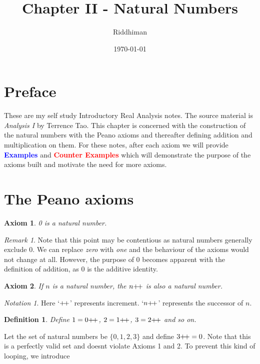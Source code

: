 \documentclass[12pt]{article}
\title{Chapter II - Natural Numbers}
\author{Riddhiman}
\date{\monthyeardate\today}
\newtheorem{axiom}{Axiom}
\newtheorem{definition}{Definition}[section]
\theoremstyle{remark}
\newtheorem*{remark}{Remark}
\newtheorem*{notation}{Notation}
\begin{document}
\def\inc{{\mathrel+\joinrel\mathrel+}}  

\maketitle

\section{Preface}%
\label{sec:Preface}
These are my self study Introductory Real Analysis notes. The source material is \textit{Analysis I} by Terrence Tao. This chapter is concerned with the construction of the natural numbers with the Peano axioms and thereafter defining addition and multiplication on them. For these notes, after each axiom we will provide \textcolor{blue}{\textbf{Examples}} and \textcolor{red}{\textbf{Counter Examples}} which will demonstrate the purpose of the axioms built and motivate the need for more axioms.

\section{The Peano axioms}%
\label{sec:The Peano axioms}

\begin{axiom}
   0 is a natural number. 
\end{axiom}

\begin{remark}
    Note that this point may be contentious as natural numbers generally exclude $0$. We can replace \textit{zero} with \textit{one} and the behaviour of the axioms would not change at all. However, the purpose of $0$ becomes apparent with the definition of addition, as $0$ is the additive identity. 
\end{remark}

\begin{axiom}
	If $n$ is a natural number, the $n\inc$ is also a natural number.
\end{axiom}

\begin{notation}
	Here `$\inc$' represents increment. `$n\inc$' represents the successor of $n$. 
\end{notation}

\begin{definition}
   Define $1 = 0\inc$, $2 = 1\inc$, $3 = 2\inc$ and so on.  
\end{definition}


\begin{cexample}
	Let the set of natural numbers be $\{0, 1, 2, 3\}$ and define $3\inc = 0$. Note that this is a perfectly valid set and doesnt violate Axioms 1 and 2. To prevent this kind of looping, we introduce 
\end{cexample}
\end{document}
